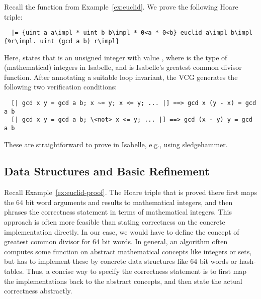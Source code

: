 \documentclass[a4paper,oribibl,envcountsame]{llncs}
\begin{document}
\begin{example}\label{ex:euclid-proof}
Recall the function  from Example~\ref{ex:euclid}.
We prove the following Hoare triple:
\begin{lstlisting}
  |= {uint a a\impl * uint b b\impl * 0<a * 0<b} euclid a\impl b\impl {%r\impl. uint (gcd a b) r\impl}
\end{lstlisting}
Here,  states that  is an unsigned integer with value , 
where  is the type of (mathematical) integers in Isabelle, and  is Isabelle's greatest common divisor function. 
After annotating a suitable loop invariant, the VCG generates the following two verification conditions:
\begin{lstlisting}
  [| gcd x y = gcd a b; x ~= y; x <= y; ... |] ==> gcd x (y - x) = gcd a b
  [| gcd x y = gcd a b; \<not> x <= y; ... |] ==> gcd (x - y) y = gcd a b
\end{lstlisting}
These are straightforward to prove in Isabelle, e.g., using sledgehammer\cite{BBP13}.
\end{example}

\subsection{Data Structures and Basic Refinement}
Recall Example~\ref{ex:euclid-proof}. The Hoare triple that is proved there first maps the 64 bit word arguments and results to mathematical integers,
and then phrases the correctness statement in terms of mathematical integers. 
This approach is often more feasible than stating correctness on the concrete implementation directly. 
In our case, we would have to define the concept of greatest common divisor for 64 bit words. In general, an algorithm often 
computes some function on abstract mathematical concepts like integers or sets, but has to implement these by concrete data structures like 64 bit words or hash-tables.
Thus, a concise way to specify the correctness statement is to first map the implementations back to the abstract concepts, and then state 
the actual correctness abstractly. 
\end{document}
